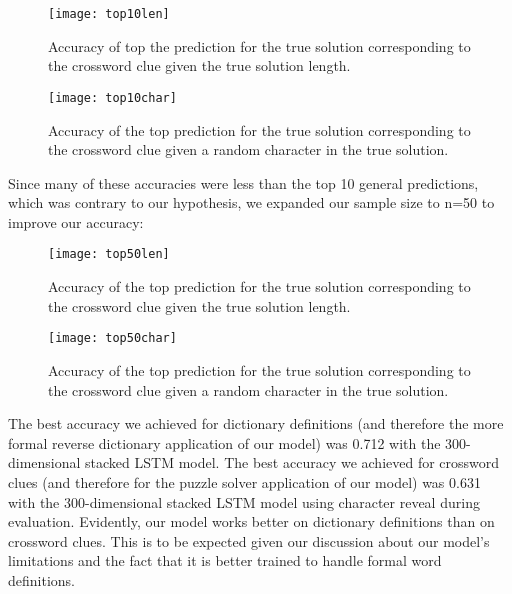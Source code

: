 \documentclass{article} %
\begin{document}
\begin{figure}
	\texttt{[image: top10len]}
	\label{Fig 4}
	\caption{Accuracy of top the prediction for the true solution corresponding to the crossword clue given the true solution length.}
\end{figure}

\begin{figure}
	\texttt{[image: top10char]}
	\label{Fig 5}
	\caption{Accuracy of the top prediction for the true solution corresponding to the crossword clue given a random character in the true solution.}
\end{figure}

Since many of these accuracies were less than the top 10 general predictions, which was contrary to our hypothesis, we expanded our sample size to n=50 to improve our accuracy:

\begin{figure}
	\texttt{[image: top50len]}
	\label{Fig 4}
	\caption{Accuracy of the top prediction for the true solution corresponding to the crossword clue given the true solution length.}
\end{figure}

\begin{figure}
	\texttt{[image: top50char]}
	\label{Fig 6}
	\caption{Accuracy of the top prediction for the true solution corresponding to the crossword clue given a random character in the true solution.}
\end{figure}


The best accuracy we achieved for dictionary definitions (and therefore the more formal reverse dictionary application of our model) was 0.712 with the 300-dimensional stacked LSTM model. The best accuracy we achieved for crossword clues (and therefore for the puzzle solver application of our model) was 0.631 with the 300-dimensional stacked LSTM model using character reveal during evaluation. 
Evidently, our model works better on dictionary definitions than on crossword clues. This is to be expected given our discussion about our model’s limitations and the fact that it is better trained to handle formal word definitions. 
\end{document}
